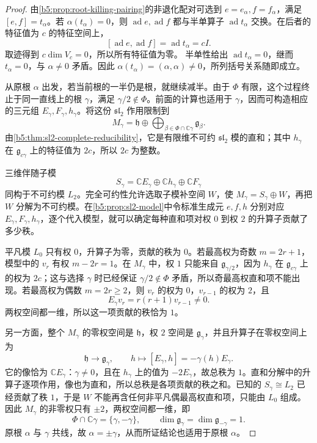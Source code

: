 \begin{proof}
	由\cref{b5:prop:root-killing-pairing}的非退化配对可选到 \(e=e_\alpha,f=f_\alpha\)，满足 \([e,f]=t_\alpha\)。若 \(\alpha(t_\alpha)=0\)，则 \(\operatorname{ad}e,\operatorname{ad}f\) 都与半单算子 \(\operatorname{ad}t_\alpha\) 交换。在后者的特征值为 \(c\) 的特征空间上，
	\[
		[\operatorname{ad}e,\operatorname{ad}f] =\operatorname{ad}t_\alpha=cI.
	\]
	取迹得到 \(c\dim V_c=0\)，所以所有特征值为零。 半单性给出 \(\operatorname{ad}t_\alpha=0\)，继而 \(t_\alpha=0\)，与 \(\alpha\ne0\) 矛盾。因此 \(\alpha(t_\alpha)=(\alpha,\alpha)\ne0\)，所列括号关系随即成立。

	从原根 \(\alpha\) 出发，若当前根的一半仍是根，就继续减半。由于 \(\Phi\) 有限，这个过程终止于同一直线上的根 \(\gamma\)，满足 \(\gamma/2\notin\Phi\)。前面的计算也适用于 \(\gamma\)，因而可构造相应的三元组 \(E_\gamma,F_\gamma,h_\gamma\)。将这份 \(\mathfrak{sl}_2\) 作用限制到
	\[
		M_\gamma=\mathfrak h\oplus \bigoplus_{\beta\in\Phi\cap\mathbb C\gamma}\mathfrak g_\beta.
	\]
	由\cref{b5:thm:sl2-complete-reducibility}，它是有限维不可约 \(\mathfrak{sl}_2\) 模的直和；其中 \(h_\gamma\) 在 \(\mathfrak g_{c\gamma}\) 上的特征值为 \(2c\)，所以 \(2c\) 为整数。

	三维伴随子模
	\[
		S_\gamma=\mathbb CE_\gamma\oplus\mathbb Ch_\gamma\oplus\mathbb CF_\gamma
	\]
	同构于不可约模 \(L_2\)。完全可约性允许选取子模补空间 \(W\)，使 \(M_\gamma=S_\gamma\oplus W\)，再把 \(W\) 分解为不可约模。在\cref{b5:prop:sl2-model}中令标准生成元 \(e,f,h\) 分别对应 \(E_\gamma,F_\gamma,h_\gamma\)，逐个代入模型，就可以确定每种直和项对权 \(0\) 到权 \(2\) 的升算子贡献了多少秩。

	平凡模 \(L_0\) 只有权 \(0\)，升算子为零，贡献的秩为 \(0\)。若最高权为奇数 \(m=2r+1\)，模型中的 \(v_r\) 有权 \(m-2r=1\)。在 \(M_\gamma\) 中，权 \(1\) 只能来自 \(\mathfrak g_{\gamma/2}\)，因为 \(h_\gamma\) 在 \(\mathfrak g_{c\gamma}\) 上的权为 \(2c\)；这与选择 \(\gamma\) 时已经保证 \(\gamma/2\notin\Phi\) 矛盾，所以奇最高权直和项不能出现。若最高权为偶数 \(m=2r\geq2\)，则 \(v_r\) 的权为 \(0\)，\(v_{r-1}\) 的权为 \(2\)，且
	\[
		E_\gamma v_r=r(r+1)v_{r-1}\ne0.
	\]
	两权空间都一维，所以这一项贡献的秩恰为 \(1\)。

	另一方面，整个 \(M_\gamma\) 的零权空间是 \(\mathfrak h\)，权 \(2\) 空间是 \(\mathfrak g_\gamma\)，并且升算子在零权空间上为
	\[
		\mathfrak h\longrightarrow\mathfrak g_\gamma,\qquad h\longmapsto[E_\gamma,h]=-\gamma(h)E_\gamma.
	\]
	它的像恰为 \(\mathbb CE_\gamma\)：\(\gamma\ne0\)，且在 \(h_\gamma\) 上的值为 \(-2E_\gamma\)，故总秩为 \(1\)。直和分解中的升算子逐项作用，像也为直和，所以总秩是各项贡献的秩之和。已知的 \(S_\gamma\cong L_2\) 已经贡献了秩 \(1\)，于是 \(W\) 不能再含任何非平凡偶最高权直和项，只能由 \(L_0\) 组成。因此 \(M_\gamma\) 的非零权只有 \(\pm2\)，两权空间都一维，即
	\[
		\Phi\cap\mathbb C\gamma=\{\gamma,-\gamma\},\qquad \dim\mathfrak g_\gamma=\dim\mathfrak g_{-\gamma}=1.
	\]
	原根 \(\alpha\) 与 \(\gamma\) 共线，故 \(\alpha=\pm\gamma\)，从而所证结论也适用于原根 \(\alpha\)。
\end{proof}


